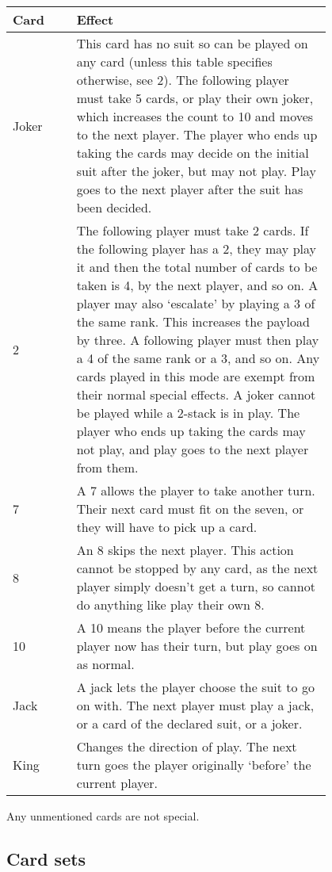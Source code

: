 \documentclass{article}
\begin{document}
    \begin{center}
    {
    \renewcommand{\arraystretch}{2.0}
    \begin{tabular}{lp{0.8\linewidth}} \toprule
    Card & Effect \\ \midrule
    Joker &
    This card has no suit so can be played on any card (unless this table
    specifies otherwise, see 2). The following player must take 5 cards, or
    play their own joker, which increases the count to 10 and moves to the next
    player. The player who ends up taking the cards may decide on the initial
    suit after the joker, but may not play. Play goes to the next player after
    the suit has been decided. \label{card:joker}
    \\ 2 &
    The following player must take 2 cards. If the following player has a 2,
    they may play it and then the total number of cards to be taken is 4, by
    the next player, and so on. A player may also `escalate' by playing a 3 of
    the same rank. This increases the payload by three. A following player must
    then play a 4 of the same rank or a 3, and so on. Any cards played in this
    mode are exempt from their normal special effects. A joker cannot be played
    while a 2-stack is in play. The player who ends up taking the cards may not
    play, and play goes to the next player from them.
    \\ 7 &
    A 7 allows the player to take another turn. Their next card must fit on
    the seven, or they will have to pick up a card.
    \\ 8 &
    An 8 skips the next player. This action cannot be stopped by any card,
    as the next player simply doesn't get a turn, so cannot do anything like
    play their own 8.
    \\ 10 &
    A 10 means the player before the current player now has their turn, but
    play goes on as normal.
    \\ Jack &
    A jack lets the player choose the suit to go on with. The next player must
    play a jack, or a card of the declared suit, or a joker.
    \\ King &
    Changes the direction of play. The next turn goes the player originally
    `before' the current player.
    \\ \bottomrule
    \end{tabular}
    }
    \end{center}

    Any unmentioned cards are not special.

    \subsection{Card sets} \label{rule:sets}
\end{document}

